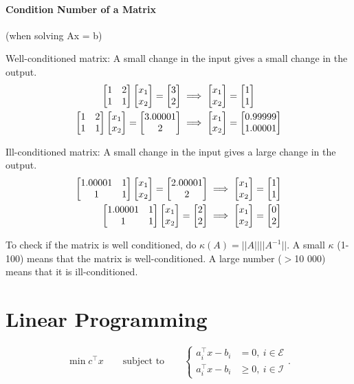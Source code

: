 \documentclass{article}
\begin{document}
\paragraph{Condition Number of a Matrix} (when solving Ax = b)

\medskip Well-conditioned matrix: A small change in the input gives a small change in the output.
\begin{align*}
  \begin{bmatrix} 1 & 2 \\ 1 & 1 \end{bmatrix}\begin{bmatrix} x_1 \\ x_2 \end{bmatrix} = \begin{bmatrix} 3 \\ 2 \end{bmatrix} &\implies \begin{bmatrix} x_1 \\ x_2 \end{bmatrix} = \begin{bmatrix} 1 \\ 1 \end{bmatrix} \\
  \begin{bmatrix} 1 & 2 \\ 1 & 1 \end{bmatrix}\begin{bmatrix} x_1 \\ x_2 \end{bmatrix} = \begin{bmatrix} 3.00001 \\ 2 \end{bmatrix} &\implies \begin{bmatrix} x_1 \\ x_2 \end{bmatrix} = \begin{bmatrix} 0.99999 \\ 1.00001 \end{bmatrix} \\
\end{align*}

Ill-conditioned matrix: A small change in the input gives a large change in the output.
\begin{align*}
  \begin{bmatrix} 1.00001 & 1 \\ 1 & 1 \end{bmatrix}\begin{bmatrix} x_1 \\ x_2 \end{bmatrix} = \begin{bmatrix} 2.00001 \\ 2 \end{bmatrix} &\implies \begin{bmatrix} x_1 \\ x_2 \end{bmatrix} = \begin{bmatrix} 1 \\ 1 \end{bmatrix} \\
  \begin{bmatrix} 1.00001 & 1 \\ 1 & 1 \end{bmatrix}\begin{bmatrix} x_1 \\ x_2 \end{bmatrix} = \begin{bmatrix} 2 \\ 2 \end{bmatrix} &\implies \begin{bmatrix} x_1 \\ x_2 \end{bmatrix} = \begin{bmatrix} 0 \\ 2 \end{bmatrix} \\
\end{align*}

To check if the matrix is well conditioned, do $\kappa (A) = ||A||||A^{-1}||$. A small $\kappa$ (1-100) means that
the matrix is well-conditioned. A large number ($>$10 000) means that it is ill-conditioned.

\section{Linear Programming}

\begin{minipage}[c]{0.5\textwidth}
  \[
    \min c^{\top}x \qquad\text{subject to}\qquad
    \left\{
    \begin{aligned}
      a_i ^{\top}x - b_i & = 0,\ i\in \mathcal{E}    \\
      a_i ^{\top}x - b_i & \geq 0,\ i\in \mathcal{I}
    \end{aligned}
    \right.
    .\]
\end{minipage}
\begin{minipage}[c]{0.5\textwidth}
\end{minipage}
\end{document}
